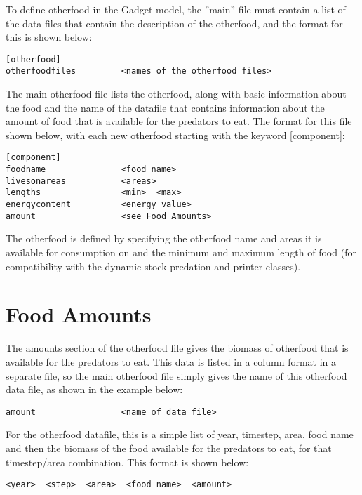 \documentclass[10pt,twoside]{book}
\begin{document}
\bigskip
To define otherfood in the Gadget model, the ''main'' file must contain a list of the data files that contain the description of the otherfood, and the format for this is shown below:

{\small\begin{verbatim}
[otherfood]
otherfoodfiles         <names of the otherfood files>
\end{verbatim}}

The main otherfood file lists the otherfood, along with basic information about the food and the name of the datafile that contains information about the amount of food that is available for the predators to eat.  The format for this file shown below, with each new otherfood starting with the keyword [component]:

{\small\begin{verbatim}
[component]
foodname               <food name>
livesonareas           <areas>
lengths                <min>  <max>
energycontent          <energy value>
amount                 <see Food Amounts>
\end{verbatim}}

The otherfood is defined by specifying the otherfood name and areas it is available for consumption on and the minimum and maximum length of food (for compatibility with the dynamic stock predation and printer classes).

\section{Food Amounts}\label{sec:foodamounts}
The amounts section of the otherfood file gives the biomass of otherfood that is available for the predators to eat.  This data is listed in a column format in a separate file, so the main otherfood file simply gives the name of this otherfood data file, as shown in the example below:

{\small\begin{verbatim}
amount                 <name of data file>
\end{verbatim}}

For the otherfood datafile, this is a simple list of year, timestep, area, food name and then the biomass of the food available for the predators to eat, for that timestep/area combination.  This format is shown below:

{\small\begin{verbatim}
<year>  <step>  <area>  <food name>  <amount>
\end{verbatim}}
\end{document}
